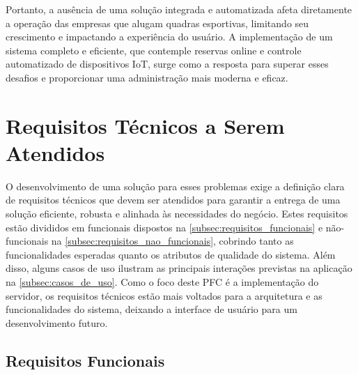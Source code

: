 Portanto, a ausência de uma solução integrada e automatizada afeta diretamente a operação das empresas que alugam quadras esportivas, limitando seu crescimento e impactando a experiência do usuário. A implementação de um sistema completo e eficiente, que contemple reservas online e controle automatizado de dispositivos IoT, surge como a resposta para superar esses desafios e proporcionar uma administração mais moderna e eficaz.


\section{Requisitos Técnicos a Serem Atendidos}

O desenvolvimento de uma solução para esses problemas exige a definição clara de requisitos técnicos que devem ser atendidos para garantir a entrega de uma solução eficiente, robusta e alinhada às necessidades do negócio. Estes requisitos estão divididos em funcionais dispostos na \autoref{subsec:requisitos_funcionais} e não-funcionais na \autoref{subsec:requisitos_nao_funcionais}, cobrindo tanto as funcionalidades esperadas quanto os atributos de qualidade do sistema. Além disso, alguns casos de uso ilustram as principais interações previstas na aplicação na \autoref{subsec:casos_de_uso}. Como o foco deste PFC é a implementação do servidor, os requisitos técnicos estão mais voltados para a arquitetura e as funcionalidades do sistema, deixando a interface de usuário para um desenvolvimento futuro.

\subsection{Requisitos Funcionais}\label{subsec:requisitos_funcionais}

